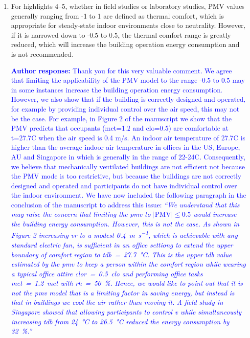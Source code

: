 \documentclass[a4paper, 10pt]{letter}
\newcommand{\response}[1]{\textcolor{blue}{\textbf{Author response:} #1}}
\begin{document}
\begin{letter}
\begin{enumerate}
            \item For highlights 4--5, whether in field studies or laboratory studies, PMV values generally ranging from -1 to 1 are defined as thermal comfort, which is appropriate for steady-state indoor environments close to neutrality.
            However, if it is narrowed down to -0.5 to 0.5, the thermal comfort range is greatly reduced, which will increase the building operation energy consumption and is not recommended.

            \response{
                Thank you for this very valuable comment.
                We agree that limiting the applicability of the PMV model to the range -0.5 to 0.5 may in some instances increase the building operation energy consumption.
                However, we also show that if the building is correctly designed and operated, for example by providing individual control over the air speed, this may not be the case.
                For example, in Figure 2 of the manuscript we show that the PMV predicts that occupants (met=1.2 and clo=0.5) are comfortable at t=27.7C when the air speed is 0.4 m/s.
                An indoor air temperature of 27.7C is higher than the average indoor air temperature in offices in the US, Europe, AU and Singapore in which is generally in the range of 22-24C.
                Consequently, we believe that mechanically ventilated buildings are not efficient not because the PMV mode is too restrictive, but because the buildings are not correctly designed and operated and participants do not have individual control over the indoor environment.
                We have now included the following paragraph in the conclusion of the manuscript to address this issue: \textit{``We understand that this may raise the concern that limiting the \ac{pmv} to $\lvert \textrm{PMV}\lvert \leq 0.5$ would increase the building energy consumption.
            However, this is not the case.
            As shown in Figure 2 increasing \ac{vr} to a modest \qty{0.4}{\m\per\s}, which is achievable with any standard electric fan, is sufficient in an office settiong to extend the upper boundary of comfort region to \ac{tdb}~=~\qty{27.7}{\celsius}.
            This is the upper \ac{tdb} value estimated by the \ac{pmv} to keep a person within the comfort region while wearing a typical office attire \ac{clor}~=~\qty{0.5}{clo} and performing office tasks \ac{met}~=~\qty{1.2}{met} with \ac{rh}~=~\qty{50}{\percent}.
            Hence, we would like to point out that it is not the \ac{pmv} model that is a limiting factor in saving energy, but instead is that in buildings we cool the air rather than moving it.
            A field study in Singapore showed that allowing participants to control \ac{v} while simultaneously increasing \ac{tdb} from \qty{24}{\celsius} to \qty{26.5}{\celsius} reduced the energy consumption by \qty{32}{\percent}.''}
            }


\end{enumerate}
\end{letter}
\end{document}

